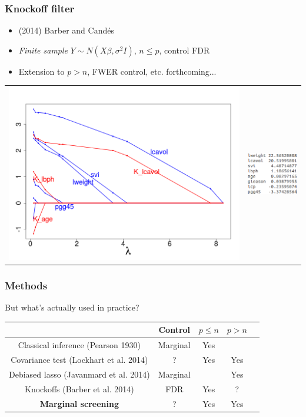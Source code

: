 \documentclass{beamer}
\begin{document}
\begin{frame}
\frametitle{Knockoff filter}
\begin{itemize}
\item (2014) Barber and Cand\'{e}s
\item \emph{Finite sample} $Y \sim N(X\beta, \sigma^2 I)$, $n \leq p$, control FDR
\item Extension to $p > n$, FWER control, etc. forthcoming...
\end{itemize}
\begin{center}
\begin{tabular}{cc}
\includegraphics[scale = 0.25]{knockoff.png} &
\includegraphics[scale = 0.5, trim=0in -1in 0.5in 0in, clip]{knockoff2.png}
\end{tabular}
\end{center}
\end{frame}


\begin{frame}
\frametitle{Methods}
But what's actually used in practice?
\begin{center}
\begin{tabular}{c|c|c|c|c}
 & Control & $p \leq n$ &  $p > n$\\ \hline
Classical inference (Pearson 1930) & Marginal & Yes & \\ \hline
Covariance test (Lockhart et al. 2014) &  ? & Yes & Yes\\ \hline
Debiased lasso (Javanmard et al. 2014) & Marginal & & Yes\\ \hline
Knockoffs (Barber et al. 2014) & FDR & Yes & ? \\ \hline
\textbf{Marginal screening} & ? & Yes & Yes \\ \hline
\end{tabular}
\end{center}
\end{frame}
\end{document}
